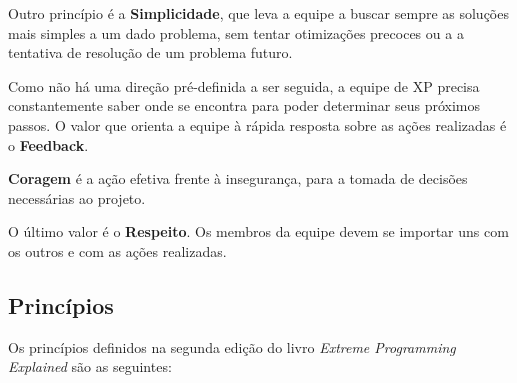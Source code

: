     Outro princípio é a \textbf{Simplicidade}, que leva a equipe a buscar sempre as soluções mais simples a um dado problema, sem tentar otimizações precoces ou a a tentativa de resolução de um problema futuro.

    Como não há uma direção pré-definida a ser seguida, a equipe de XP precisa constantemente saber onde se encontra para poder determinar seus próximos passos. O valor que orienta a equipe à rápida resposta sobre as ações realizadas é o \textbf{Feedback}.

    \textbf{Coragem} é a ação efetiva frente à insegurança, para a tomada de decisões necessárias ao projeto.

    O último valor é o \textbf{Respeito}. Os membros da equipe devem se importar uns com os outros e com as ações realizadas.

  \subsection{Princípios}

    Os princípios definidos na segunda edição do livro \textit{Extreme Programming Explained}\cite{beck04} são as seguintes:


